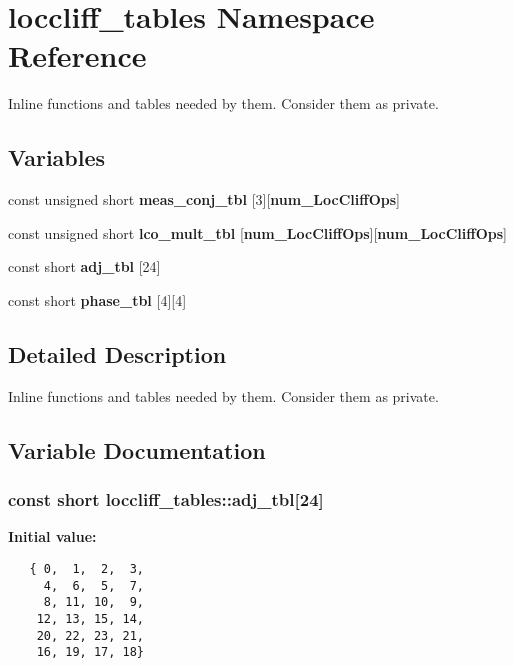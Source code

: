 \section{loccliff\_\-tables Namespace Reference}
\label{namespaceloccliff__tables}
Inline functions and tables needed by them. Consider them as private.  


\subsection*{Variables}
\begin{CompactItemize}
\item 
const  unsigned short {\bf meas\_\-conj\_\-tbl} [3][{\bf num\_\-Loc\-Cliff\-Ops}]
\item 
const  unsigned short {\bf lco\_\-mult\_\-tbl} [{\bf num\_\-Loc\-Cliff\-Ops}][{\bf num\_\-Loc\-Cliff\-Ops}]\label{namespaceloccliff__tables_a1}

\item 
const  short {\bf adj\_\-tbl} [24]
\item 
const  short {\bf phase\_\-tbl} [4][4]
\end{CompactItemize}


\subsection{Detailed Description}
Inline functions and tables needed by them. Consider them as private. 

\subsection{Variable Documentation}
\subsubsection{\setlength{\rightskip}{0pt plus 5cm}const short loccliff\_\-tables::adj\_\-tbl[24]}\label{namespaceloccliff__tables_a2}


{\bf Initial value:}

\footnotesize\begin{verbatim}
   { 0,  1,  2,  3,
     4,  6,  5,  7,
     8, 11, 10,  9,
    12, 13, 15, 14,
    20, 22, 23, 21,
    16, 19, 17, 18}
\end{verbatim}\normalsize 
{}
